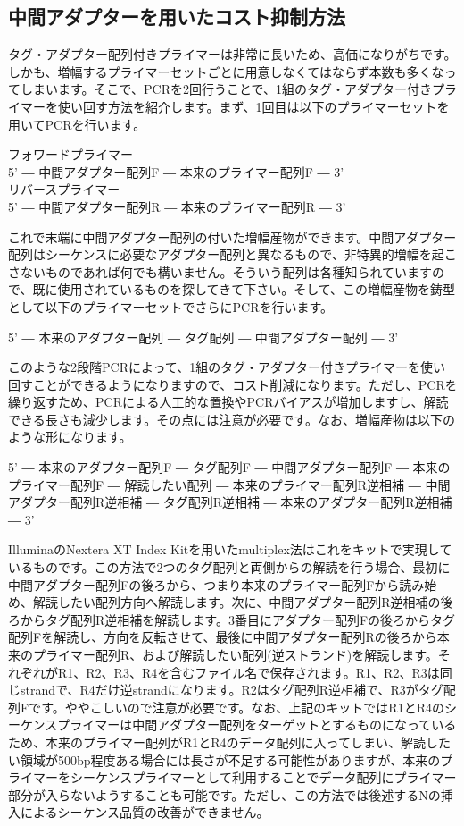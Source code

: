 \documentclass[titlepage,10pt,a4paper]{jsbook}
\newenvironment{pre}{\begin{leftbar}\raggedright\ttfamily\footnotesize\setlength{\baselineskip}{1.4em}}{\end{leftbar}\vspace{-1em}}
\begin{document}
\subsection{中間アダプターを用いたコスト抑制方法}

タグ・アダプター配列付きプライマーは非常に長いため、高価になりがちです。しかも、増幅するプライマーセットごとに用意しなくてはならず本数も多くなってしまいます。そこで、PCRを2回行うことで、1組のタグ・アダプター付きプライマーを使い回す方法を紹介します。まず、1回目は以下のプライマーセットを用いてPCRを行います。
\begin{pre}
フォワードプライマー\\
5' ― 中間アダプター配列F ― 本来のプライマー配列F ― 3'\\
リバースプライマー\\
5' ― 中間アダプター配列R ― 本来のプライマー配列R ― 3'
\end{pre}
これで末端に中間アダプター配列の付いた増幅産物ができます。中間アダプター配列はシーケンスに必要なアダプター配列と異なるもので、非特異的増幅を起こさないものであれば何でも構いません。そういう配列は各種知られていますので、既に使用されているものを探してきて下さい。そして、この増幅産物を鋳型として以下のプライマーセットでさらにPCRを行います。
\begin{pre}
5' ― 本来のアダプター配列 ― タグ配列 ― 中間アダプター配列 ― 3'
\end{pre}
このような2段階PCRによって、1組のタグ・アダプター付きプライマーを使い回すことができるようになりますので、コスト削減になります。ただし、PCRを繰り返すため、PCRによる人工的な置換やPCRバイアスが増加しますし、解読できる長さも減少します。その点には注意が必要です。なお、増幅産物は以下のような形になります。
\begin{pre}
5' ― 本来のアダプター配列F ― タグ配列F ― 中間アダプター配列F ― 本来のプライマー配列F ― 解読したい配列 ― 本来のプライマー配列R逆相補 ― 中間アダプター配列R逆相補 ― タグ配列R逆相補 ― 本来のアダプター配列R逆相補 ― 3'
\end{pre}
IlluminaのNextera XT Index Kitを用いたmultiplex法\citep{Illumina2013}はこれをキットで実現しているものです。この方法で2つのタグ配列と両側からの解読を行う場合、最初に中間アダプター配列Fの後ろから、つまり本来のプライマー配列Fから読み始め、解読したい配列方向へ解読します。次に、中間アダプター配列R逆相補の後ろからタグ配列R逆相補を解読します。3番目にアダプター配列Fの後ろからタグ配列Fを解読し、方向を反転させて、最後に中間アダプター配列Rの後ろから本来のプライマー配列R、および解読したい配列(逆ストランド)を解読します。それぞれがR1、R2、R3、R4を含むファイル名で保存されます。R1、R2、R3は同じstrandで、R4だけ逆strandになります。R2はタグ配列R逆相補で、R3がタグ配列Fです。ややこしいので注意が必要です。なお、上記のキットではR1とR4のシーケンスプライマーは中間アダプター配列をターゲットとするものになっているため、本来のプライマー配列がR1とR4のデータ配列に入ってしまい、解読したい領域が500bp程度ある場合には長さが不足する可能性がありますが、本来のプライマーをシーケンスプライマーとして利用することでデータ配列にプライマー部分が入らないようすることも可能です。ただし、この方法では後述するNの挿入によるシーケンス品質の改善ができません。
\end{document}
